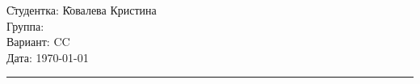 \begin{tabbing}
	\hspace{11cm} \= Студентка: \= Ковалева Кристина \\	%
	\> Группа:  \\	%
	\> Вариант: \> CC \\		%
	\> Дата: \> \today		%
\end{tabbing}
\hrule
\vspace{1cm}